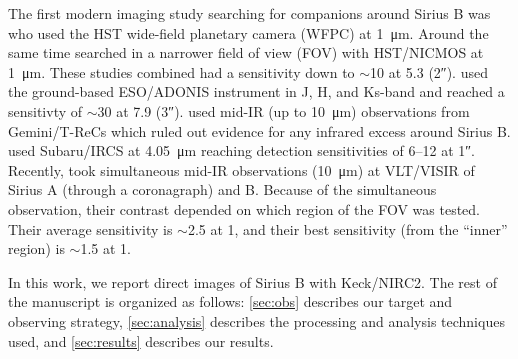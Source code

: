\documentclass[twocolumn,linenumbers]{aastex631}
\begin{document}
The first modern imaging study searching for companions around Sirius B was \citet{schroederSearchFaintCompanions2000} who used the HST wide-field planetary camera (WFPC) at \qty{1}{\micro\meter}. Around the same time \citet{kuchnerSearchExozodiacalDust2000} searched in a narrower field of view (FOV) with HST/NICMOS at \qty{1}{\micro\meter}. These studies combined had a sensitivity down to $\sim$\qty{10}{\jupitermass} at \qty{5.3}{\au} (\ang{;;2}). \citet{bonnet-bidaudADONISHighContrast2008a} used the ground-based ESO/ADONIS instrument in J, H, and Ks-band and reached a sensitivty of $\sim$\qty{30}{\jupitermass} at \qty{7.9}{\au} (\ang{;;3}). \citet{skemerSiriusImagedMidinfrared2011} used mid-IR (up to \qty{10}{\micro\meter}) observations from Gemini/T-ReCs which ruled out evidence for any infrared excess around Sirius B. \citet{thalmannPiercingGlareDirect2011} used Subaru/IRCS at \qty{4.05}{\micro\meter} reaching detection sensitivities of \qtyrange{6}{12}{\jupitermass} at \ang{;;1}. Recently, \citet{pathakHighContrastImaging2021} took simultaneous mid-IR observations (\qty{10}{\micro\meter}) at VLT/VISIR of Sirius A (through a coronagraph) and B. Because of the simultaneous observation, their contrast depended on which region of the FOV was tested. Their average sensitivity is $\sim$\qty{2.5}{\jupitermass} at \qty{1}{\au}, and their best sensitivity (from the ``inner'' region) is $\sim$\qty{1.5}{\jupitermass} at \qty{1}{\au}.

In this work, we report direct images of Sirius B with Keck/NIRC2. The rest of the manuscript is organized as follows: \cref{sec:obs} describes our target and observing strategy, \cref{sec:analysis} describes the processing and analysis techniques used, and \cref{sec:results} describes our results.
\end{document}
